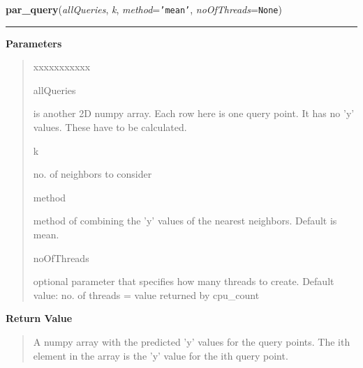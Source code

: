\hspace{.8\funcindent}\begin{boxedminipage}{\funcwidth}

    \raggedright \textbf{par\_query}(\textit{allQueries}, \textit{k}, \textit{method}={\tt \texttt{'}\texttt{mean}\texttt{'}}, \textit{noOfThreads}={\tt None})

    \vspace{-1.5ex}

    \rule{\textwidth}{0.5\fboxrule}
\setlength{\parskip}{2ex}
\setlength{\parskip}{1ex}
      \textbf{Parameters}
      \vspace{-1ex}

      \begin{quote}
        \begin{Ventry}{xxxxxxxxxxx}

          \item[allQueries]

          is another 2D numpy array. Each row here is one query point. It 
          has no 'y' values. These have to be calculated.

          \item[k]

          no. of neighbors to consider

          \item[method]

          method of combining the 'y' values of the nearest neighbors. 
          Default is mean.

          \item[noOfThreads]

          optional parameter that specifies how many threads to create. 
          Default value: no. of threads = value returned by cpu\_count

        \end{Ventry}

      \end{quote}

      \textbf{Return Value}
    \vspace{-1ex}

      \begin{quote}
      A numpy array with the predicted 'y' values for the query points. The
      ith element in the array is the 'y' value for the ith query point.

      \end{quote}

    \end{boxedminipage}

